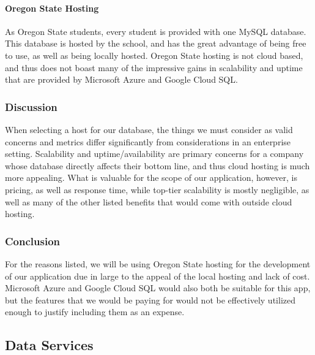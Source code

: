 \documentclass[onecolumn, draftclsnofoot,10pt, compsoc]{IEEEtran}
\begin{document}
 
\paragraph{Oregon State Hosting}
As Oregon State students, every student is provided with one MySQL database. This database is hosted by the school, and has the great advantage of being free to use, as well as being locally hosted. Oregon State hosting is not cloud based, and thus does not boast many of the impressive gains in scalability and uptime that are provided by Microsoft Azure and Google Cloud SQL.

\subsubsection{Discussion}
When selecting a host for our database, the things we must consider as valid concerns and metrics differ significantly from considerations in an enterprise setting. Scalability and uptime/availability are primary concerns for a company whose database directly affects their bottom line, and thus cloud hosting is much more appealing. What is valuable for the scope of our application, however, is pricing, as well as response time, while top-tier scalability is mostly negligible, as well as many of the other listed benefits that would come with outside cloud hosting.


\subsubsection{Conclusion}
For the reasons listed, we will be using Oregon State hosting for the development of our application due in large to the appeal of the local hosting and lack of cost. Microsoft Azure and Google Cloud SQL would also both be suitable for this app, but the features that we would be paying for would not be effectively utilized enough to justify including them as an expense. 

\subsection{Data Services}
\end{document}
